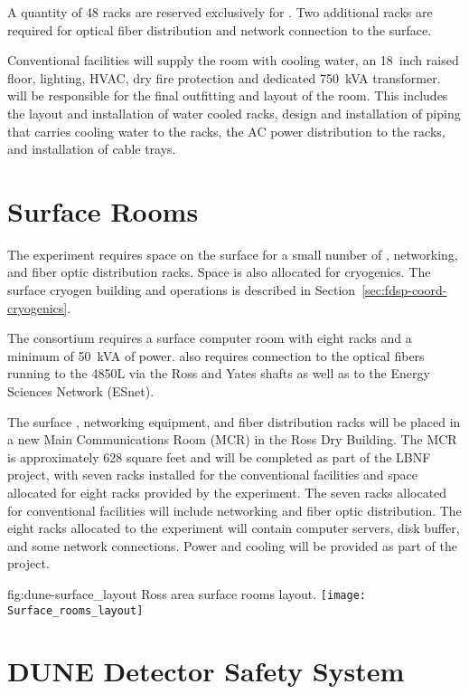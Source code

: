 A quantity of 48 racks are reserved exclusively for .  Two
additional racks are required for optical fiber distribution and
network connection to the surface.

Conventional facilities will supply the  room with cooling
water, an 18~inch raised floor, lighting, HVAC, dry fire protection
and dedicated 750~kVA transformer.   will be responsible for
the final outfitting and layout of the room.  This includes the layout
and installation of water cooled racks, design and installation of
piping that carries cooling water to the racks, the AC power
distribution to the racks, and installation of cable trays.

\section{Surface Rooms}
\label{sec:fdsp-coord-surf-rooms}

The  experiment requires space on the surface for a small
number of , networking, and fiber optic distribution racks.  Space
is also allocated for cryogenics.  The surface cryogen building and
operations is described in 
Section~\ref{sec:fdsp-coord-cryogenics}.

The  consortium requires a surface computer room with eight
racks and a minimum of 50~kVA of power.   also requires connection
to the optical fibers running to the 4850L via the Ross and Yates
shafts as well as to the Energy Sciences Network (ESnet).

The surface , networking equipment, and fiber distribution racks
will be placed in a new Main Communications Room (MCR) in the Ross Dry
Building.  The MCR is approximately 628 square feet and will be
completed as part of the LBNF project, with seven racks installed for
the conventional facilities and space allocated for eight racks
provided by the experiment.  The seven racks allocated for
conventional facilities will include networking and fiber optic
distribution.  The eight racks allocated to the experiment will
contain computer servers, disk buffer, and some network connections.
Power and cooling will be provided as part of the  project.
\begin{dunefigure}{fig:dune-surface_layout}
  {Ross area surface rooms layout.}
  \texttt{[image: Surface\_rooms\_layout]}
\end{dunefigure}

\section{DUNE Detector Safety System}
\label{sec:fdsp-coord-det-safety}


